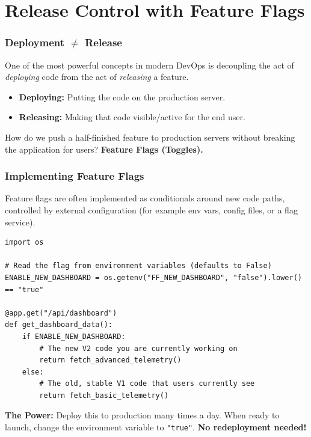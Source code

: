 \documentclass[xcolor=table]{beamer}
\begin{document}
\section{Release Control with Feature Flags}

\begin{frame}
    \frametitle{Deployment $\neq$ Release}
    One of the most powerful concepts in modern DevOps is decoupling the act of \textit{deploying} code from the act of \textit{releasing} a feature.
    
    \begin{itemize}
        \item \textbf{Deploying:} Putting the code on the production server.
        \item \textbf{Releasing:} Making that code visible/active for the end user.
    \end{itemize}
    
    \vspace{0.3cm}
    How do we push a half-finished feature to production servers without breaking the application for users? \textbf{Feature Flags (Toggles).}
\end{frame}

\begin{frame}[fragile]
    \frametitle{Implementing Feature Flags}
    Feature flags are often implemented as conditionals around new code paths, controlled by external configuration (for example env vars, config files, or a flag service).
    
    \begin{verbatim}
import os

# Read the flag from environment variables (defaults to False)
ENABLE_NEW_DASHBOARD = os.getenv("FF_NEW_DASHBOARD", "false").lower() == "true"

@app.get("/api/dashboard")
def get_dashboard_data():
    if ENABLE_NEW_DASHBOARD:
        # The new V2 code you are currently working on
        return fetch_advanced_telemetry()
    else:
        # The old, stable V1 code that users currently see
        return fetch_basic_telemetry()
    \end{verbatim}

    \vspace{0.2cm}
    \textbf{The Power:} Deploy this to production many times a day. When ready to launch, change the environment variable to \texttt{"true"}. \textbf{No redeployment needed!}
\end{frame}
\end{document}
